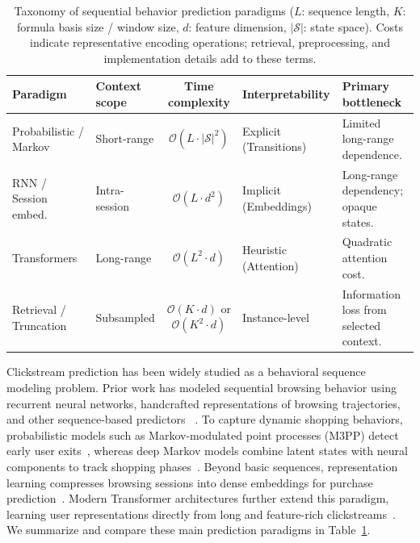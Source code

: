 \documentclass[sigconf,anonymous,nonacm]{acmart}
\newif\ifrevisions
\newcommand{\rev}[1]{\ifrevisions\textcolor{red}{#1}\else#1\fi}
\begin{document}
\begin{table}[t]
  \centering
  \small
  \rev{}\caption{Taxonomy of sequential behavior prediction paradigms ($L$: sequence length, $K$: formula basis size / window size, $d$: feature dimension, $|\mathcal{S}|$: state space). \rev{Costs indicate representative encoding operations; retrieval, preprocessing, and implementation details add to these terms.}}
  \label{tab:related_work_taxonomy}
  \begin{tabularx}{\textwidth}{l l c l X}
    \toprule
    \textbf{Paradigm} & \textbf{Context scope} & \textbf{Time complexity} & \textbf{Interpretability} & \textbf{Primary bottleneck} \\
    \midrule
    Probabilistic / Markov~\cite{hatt2020early,ozyurt2022deep} & Short-range & $\mathcal{O}(L \cdot |\mathcal{S}|^2)$ & Explicit (Transitions) & Limited long-range dependence. \\
    RNN / Session embed.~\cite{koehn2020predicting,alves2022will} & Intra-session & $\mathcal{O}(L \cdot d^2)$ & Implicit (Embeddings) & Long-range dependency; opaque states. \\
    Transformers~\cite{black2024trace} & Long-range & $\mathcal{O}(L^2 \cdot d)$ & Heuristic (Attention) & Quadratic attention cost. \\
    Retrieval / Truncation~\cite{li2026lifelong,lin2026mixture} & Subsampled & $\mathcal{O}(K \cdot d)$ or $\mathcal{O}(K^2 \cdot d)$ & Instance-level & Information loss from selected context. \\
    \bottomrule
 
  \end{tabularx}
\end{table}

Clickstream prediction has been widely studied as a behavioral sequence modeling problem.
Prior work has modeled sequential browsing behavior using recurrent neural networks,
handcrafted representations of browsing trajectories, and other sequence-based predictors
~\cite{koehn2020predicting,requena2020shopper}. To capture dynamic shopping behaviors, probabilistic models such as Markov-modulated point processes (M3PP) detect early user exits~\cite{hatt2020early}, whereas deep Markov models combine latent states with neural components to track shopping phases~\cite{ozyurt2022deep}. Beyond basic sequences, representation learning compresses browsing sessions into dense embeddings for purchase prediction~\cite{alves2022will}. Modern Transformer architectures further extend this paradigm, learning user representations directly from long and feature-rich clickstreams~\cite{black2024trace}. We summarize and compare these main prediction paradigms in Table~\ref{tab:related_work_taxonomy}.
\end{document}
